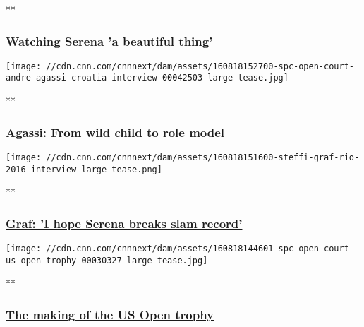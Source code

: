 **

\hypertarget{watching-serena-a-beautiful-thing}{%
\subsubsection{\texorpdfstring{\href{/videos/tv/2016/08/31/tennis-agassi-djokovic-serena.cnn}{Watching
Serena 'a beautiful
thing'}}{Watching Serena 'a beautiful thing'}}\label{watching-serena-a-beautiful-thing}}

\href{/videos/sports/2016/08/18/spc-open-court-andre-agassi-croatia-interview.cnn}{}

\texttt{[image: //cdn.cnn.com/cnnnext/dam/assets/160818152700-spc-open-court-andre-agassi-croatia-interview-00042503-large-tease.jpg]}

**

\hypertarget{agassi-from-wild-child-to-role-model}{%
\subsubsection{\texorpdfstring{\href{/videos/sports/2016/08/18/spc-open-court-andre-agassi-croatia-interview.cnn}{Agassi:
From wild child to role
model}}{Agassi: From wild child to role model}}\label{agassi-from-wild-child-to-role-model}}

\href{/videos/sports/2016/08/18/spc-open-court-steffi-graf-rio-interview.cnn}{}

\texttt{[image: //cdn.cnn.com/cnnnext/dam/assets/160818151600-steffi-graf-rio-2016-interview-large-tease.png]}

**

\hypertarget{graf-i-hope-serena-breaks-slam-record}{%
\subsubsection{\texorpdfstring{\href{/videos/sports/2016/08/18/spc-open-court-steffi-graf-rio-interview.cnn}{Graf:
'I hope Serena breaks slam
record'}}{Graf: 'I hope Serena breaks slam record'}}\label{graf-i-hope-serena-breaks-slam-record}}

\href{/videos/sports/2016/08/18/spc-open-court-us-open-trophy.cnn}{}

\texttt{[image: //cdn.cnn.com/cnnnext/dam/assets/160818144601-spc-open-court-us-open-trophy-00030327-large-tease.jpg]}

**

\hypertarget{the-making-of-the-us-open-trophy}{%
\subsubsection{\texorpdfstring{\href{/videos/sports/2016/08/18/spc-open-court-us-open-trophy.cnn}{The
making of the US Open
trophy}}{The making of the US Open trophy}}\label{the-making-of-the-us-open-trophy}}

